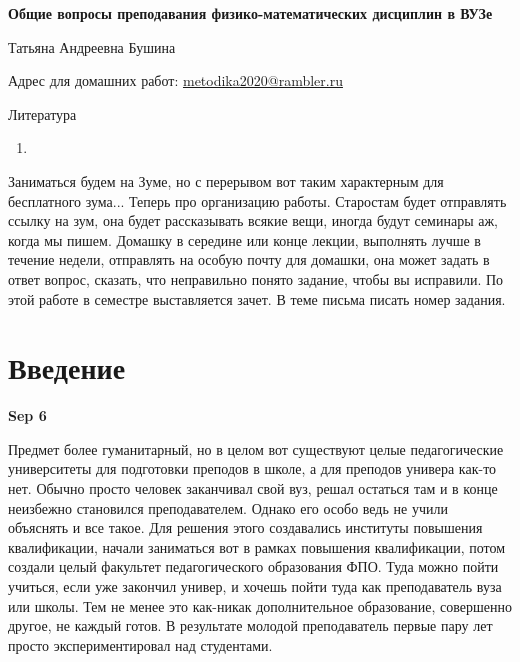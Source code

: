 \documentclass[a4paper, 12pt]{article}
\begin{document}
\null
\vfill

\begin{center}
	\begin{Large}
		\textbf{Общие вопросы преподавания физико-математических дисциплин в ВУЗе}
	\end{Large}

	\vspace{\baselineskip}

	Татьяна Андреевна Бушина

	Адрес для домашних работ:
	\href{mailto:metodika2020@rambler.ru}{metodika2020@rambler.ru}
\end{center}

\vfill

Литература
\begin{enumerate}
	\item
\end{enumerate}

Заниматься будем на Зуме, но с перерывом вот таким характерным для 
бесплатного зума...
Теперь про организацию работы. Старостам будет отправлять ссылку на зум, 
она будет рассказывать всякие вещи, иногда будут семинары аж, когда мы 
пишем. Домашку в середине или конце лекции, выполнять лучше в течение 
недели, отправлять на особую почту для домашки, она может задать в ответ 
вопрос, сказать, что неправильно понято задание, чтобы вы исправили. По 
этой работе в семестре выставляется зачет. В теме письма писать номер 
задания.

\clearpage

\tableofcontents

\clearpage

\section{Введение}

\hfill\textbf{Sep 6}

Предмет более гуманитарный, но в целом вот существуют целые 
педагогические университеты для подготовки преподов в школе, а для 
преподов универа как-то нет. Обычно просто человек заканчивал свой вуз, 
решал остаться там и в конце неизбежно становился преподавателем. Однако 
его особо ведь не учили объяснять и все такое. Для решения этого 
создавались институты повышения квалификации, начали заниматься вот 
в рамках повышения квалификации, потом создали целый факультет 
педагогического образования ФПО. Туда можно пойти учиться, если уже 
закончил универ, и хочешь пойти туда как преподаватель вуза или школы. 
Тем не менее это как-никак дополнительное образование, совершенно 
другое, не каждый готов. В результате молодой преподаватель первые пару 
лет просто экспериментировал над студентами.
\end{document}
